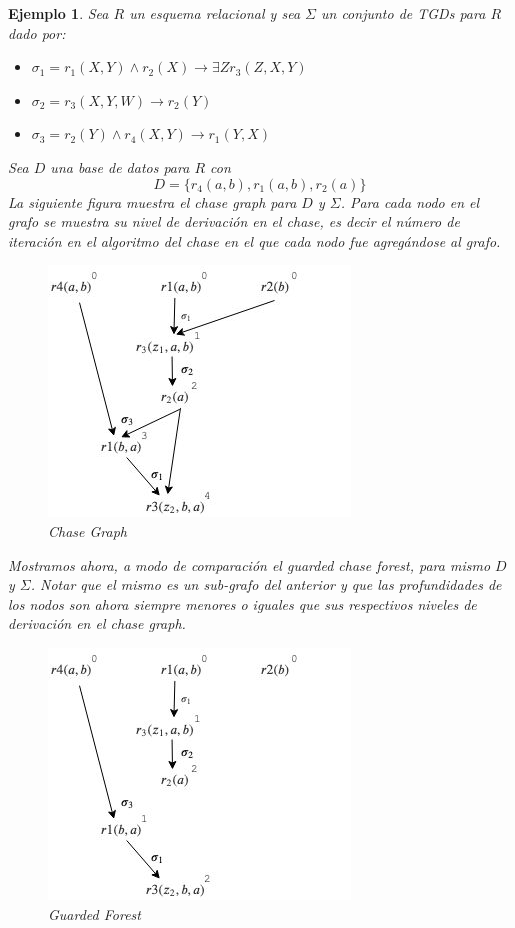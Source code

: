 \documentclass[11pt,a4paper,twoside]{tesis}
\newtheorem{exmp}{Ejemplo}
\begin{document}
\begin{exmp}\label{ejemplo_chase_forest}
    Sea $R$ un esquema relacional y sea $\Sigma$ un conjunto de TGDs para $R$ dado por:
    \begin{itemize}
        \item $\sigma_1 = r_1(X, Y) \land r_2(X) \rightarrow \exists Z r_3(Z, X, Y)$
        \item $\sigma_2 = r_3(X, Y, W) \rightarrow r_2(Y)$
        \item $\sigma_3 = r_2(Y) \land r_4(X, Y) \rightarrow r_1(Y, X)$
    \end{itemize}

Sea $D$ una base de datos para $R$ con $$D=\{r_4(a, b), r_1(a, b), r_2(a)\}$$
La siguiente figura muestra el \textit{chase graph} para $D$ y $\Sigma$. Para cada nodo en el grafo se muestra su \textit{nivel de derivación} en el chase, es decir el número de iteración en el algoritmo del chase en el que cada nodo fue agregándose al grafo.  
    
\begin{figure}[ht]
    \includegraphics[scale=0.5]{chase_graph}
    \centering
    \caption{Chase Graph}
    \label{fig:chase_graph}
\end{figure}

Mostramos ahora, a modo de comparación el \textit{guarded chase forest}, para mismo $D$ y $\Sigma$. Notar que el mismo es un sub-grafo del anterior y que las profundidades de los nodos son ahora siempre menores o iguales que sus respectivos niveles de \textit{derivación} en el  \textit{chase graph}. 

\begin{figure}[ht]
    \includegraphics[scale=0.5]{guarded_chase_forest}
    \centering
    \caption{Guarded Forest}
    \label{fig:guarded_forest}
\end{figure}

\end{exmp}
\end{document}
